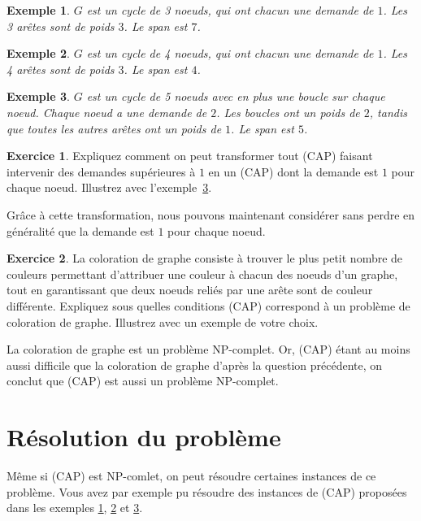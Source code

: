\documentclass[a4paper,francais]{article}
\newtheorem{Exemple}{Exemple}
\theoremstyle{definition}
\newtheorem{exercice}{Exercice}[section]
\begin{document}
\begin{Exemple}
  \label{ex:triangle}
  $G$ est un cycle de 3 noeuds, qui ont chacun une demande de $1$.
  Les 3 arêtes sont de poids $3$. Le span est $7$.
\end{Exemple}

\begin{Exemple}
  \label{ex:carre}
  $G$ est un cycle de 4 noeuds, qui ont chacun une demande de $1$.
  Les 4 arêtes sont de poids $3$. Le span est $4$.
\end{Exemple}

\begin{Exemple}
  \label{ex:demande2}
  $G$ est un cycle de 5 noeuds avec en plus une boucle sur chaque noeud.
  Chaque noeud a une demande de $2$. Les boucles ont un poids de $2$,
  tandis que toutes les autres arêtes ont un poids de $1$. Le span est $5$. 
\end{Exemple}

\begin{exercice}
  Expliquez comment on peut transformer tout (CAP) faisant intervenir
  des demandes supérieures à $1$ en un (CAP) dont la demande est $1$
  pour chaque noeud. Illustrez avec l'exemple~\ref{ex:demande2}.
\end{exercice}

Grâce à cette transformation, nous pouvons maintenant considérer sans
perdre en généralité que la demande est $1$ pour chaque noeud.

\begin{exercice}
  La coloration de graphe consiste à trouver le plus petit nombre de
  couleurs permettant d'attribuer une couleur à chacun des noeuds
  d'un graphe, tout en garantissant que deux noeuds reliés par une
  arête sont de couleur différente.
  Expliquez sous quelles conditions (CAP) correspond à un problème
  de coloration de graphe. Illustrez avec un exemple de votre choix. 
\end{exercice}

La coloration de graphe est un problème NP-complet. Or, (CAP) étant
au moins aussi difficile que la coloration de graphe d'après la
question précédente, on conclut que (CAP) est aussi un problème
NP-complet. 

\section{Résolution du problème}
\label{sec:resolution}

Même si (CAP) est NP-comlet, on peut résoudre certaines instances
de ce problème. Vous avez par exemple pu résoudre des instances de (CAP)
proposées dans les exemples \ref{ex:triangle}, \ref{ex:carre} et
\ref{ex:demande2}. 
\end{document}
